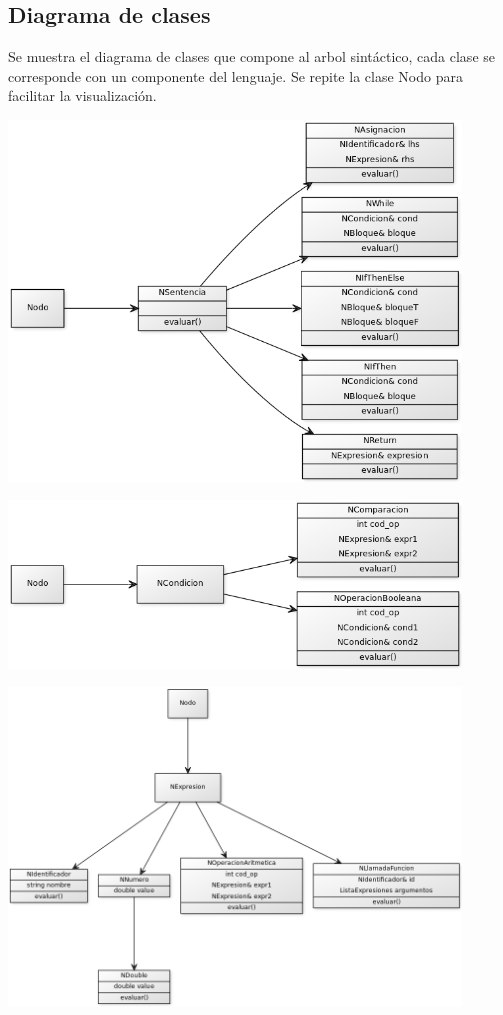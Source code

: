 \subsection{Diagrama de clases}
Se muestra el diagrama de clases que compone al arbol sintáctico, cada clase se corresponde con un componente del lenguaje.
Se repite la clase Nodo para facilitar la visualización.

\includegraphics[width=0.9\textwidth,height=0.9\textheight,keepaspectratio]{imgs/clases1.png}

\includegraphics[width=0.9\textwidth,height=0.9\textheight,keepaspectratio]{imgs/clases2.png}

\includegraphics[width=0.9\textwidth,height=0.9\textheight,keepaspectratio]{imgs/clases3.png}

